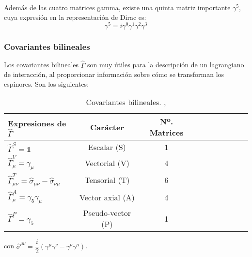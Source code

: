 Además de las cuatro matrices gamma, existe una quinta matriz importante $\gamma^5$, cuya expresión en la representación de Dirac es:
\begin{equation}
\gamma^5 = i \gamma^0 \gamma^1 \gamma^2 \gamma^3\label{eq:gamma5}
\end{equation}

\subsubsection{Covariantes bilineales}\label{sec:trazas}
Los covariantes bilineales $\widehat{\Gamma}$ son muy útiles para la descripción de un lagrangiano de interacción, al proporcionar información sobre cómo se transforman los espinores. Son los siguientes:

\begin{table}[h]
	\centering
	\begin{tabular}{l*{8}{c}r}
\hline
Expresiones de $\widehat{\Gamma}$  & Carácter & Nº. Matrices\\ 
\hline
$\widehat{\Gamma}^{S} = \mathbb{1}$ & Escalar (S) & 1\\
$\widehat{\Gamma}_{\mu}^{V} = \gamma_{\mu}$ & Vectorial (V) & 4 &\\
$\widehat{\Gamma}^{T}_{\mu\nu} = \hat{\sigma}_{\mu\nu}-\hat{\sigma}_{\nu\mu}$ & Tensorial (T) & 6\\
$\widehat{\Gamma}_{\mu}^{A} = \gamma_{5}\gamma_{\mu}$ & Vector axial (A) & 4\\
$\widehat{\Gamma}^{P} = \gamma_{5}$ & Pseudo-vector (P) & 1\\
\hline
	\end{tabular}
\caption[Covariantes bilineales]{Covariantes bilineales. \cite{MCR}, \cite{GreinerRQM}}
\label{tab:bilinear_covariant}
\end{table}

con $\hat{\sigma}^{\mu\nu}= \dfrac{i}{2} \left(\gamma^{\mu}\gamma^{\nu} - \gamma^{\nu}\gamma^{\mu} \right)$.

